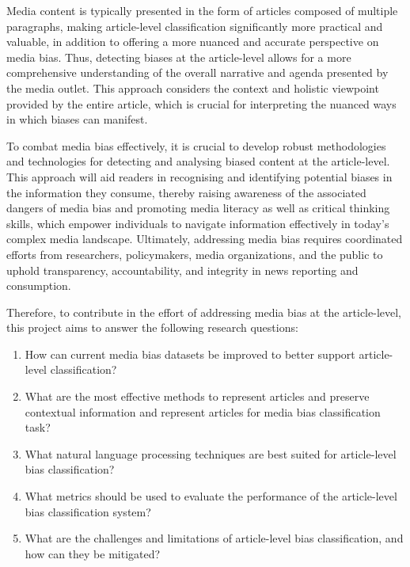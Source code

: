 \begin{comment}
Find examples of contradictory sentences bias in the same article
\end{comment}

Media content is typically presented in the form of articles composed of multiple paragraphs, making article-level classification significantly more practical and valuable, in addition to offering a more nuanced and accurate perspective on media bias. Thus, detecting biases at the article-level allows for a more comprehensive understanding of the overall narrative and agenda presented by the media outlet. This approach considers the context and holistic viewpoint provided by the entire article, which is crucial for interpreting the nuanced ways in which biases can manifest.

To combat media bias effectively, it is crucial to develop robust methodologies and technologies for detecting and analysing biased content at the article-level. This approach will aid readers in recognising and identifying potential biases in the information they consume, thereby raising awareness of the associated dangers of media bias and promoting media literacy as well as critical thinking skills, which empower individuals to navigate information effectively in today's complex media landscape. Ultimately, addressing media bias requires coordinated efforts from researchers, policymakers, media organizations, and the public to uphold transparency, accountability, and integrity in news reporting and consumption.

Therefore, to contribute in the effort of addressing media bias at the article-level, this project aims to answer the following research questions:
\begin{enumerate}
    \item How can current media bias datasets be improved to better support article-level classification?
    \item What are the most effective methods to represent articles and preserve contextual information and represent articles for media bias classification task?
    \item What natural language processing techniques are best suited for article-level bias classification?
    \item What metrics should be used to evaluate the performance of the article-level bias classification system?
    \item What are the challenges and limitations of article-level bias classification, and how can they be mitigated?
\end{enumerate}

